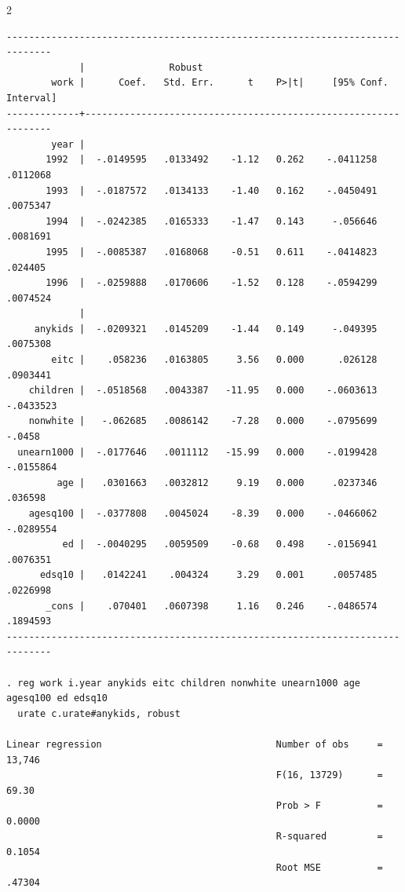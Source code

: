 \documentclass{article}
\newenvironment{changemargin}[2]{%
\begin{list}{}{%
\setlength{\topsep}{0pt}%
\setlength{\leftmargin}{#1}%
\setlength{\rightmargin}{#2}%
\setlength{\listparindent}{\parindent}%
\setlength{\itemindent}{\parindent}%
\setlength{\parsep}{\parskip}%
}%
\item[]}{\end{list}}
\begin{document}
\begin{changemargin}{-0.5in}{-0.5in}
\begin{multicols}{2}
\begin{verbatim}
------------------------------------------------------------------------------
             |               Robust
        work |      Coef.   Std. Err.      t    P>|t|     [95% Conf. Interval]
-------------+----------------------------------------------------------------
        year |
       1992  |  -.0149595   .0133492    -1.12   0.262    -.0411258    .0112068
       1993  |  -.0187572   .0134133    -1.40   0.162    -.0450491    .0075347
       1994  |  -.0242385   .0165333    -1.47   0.143     -.056646    .0081691
       1995  |  -.0085387   .0168068    -0.51   0.611    -.0414823     .024405
       1996  |  -.0259888   .0170606    -1.52   0.128    -.0594299    .0074524
             |
     anykids |  -.0209321   .0145209    -1.44   0.149     -.049395    .0075308
        eitc |    .058236   .0163805     3.56   0.000      .026128    .0903441
    children |  -.0518568   .0043387   -11.95   0.000    -.0603613   -.0433523
    nonwhite |   -.062685   .0086142    -7.28   0.000    -.0795699      -.0458
  unearn1000 |  -.0177646   .0011112   -15.99   0.000    -.0199428   -.0155864
         age |   .0301663   .0032812     9.19   0.000     .0237346     .036598
    agesq100 |  -.0377808   .0045024    -8.39   0.000    -.0466062   -.0289554
          ed |  -.0040295   .0059509    -0.68   0.498    -.0156941    .0076351
      edsq10 |   .0142241    .004324     3.29   0.001     .0057485    .0226998
       _cons |    .070401   .0607398     1.16   0.246    -.0486574    .1894593
------------------------------------------------------------------------------

. reg work i.year anykids eitc children nonwhite unearn1000 age agesq100 ed edsq10 
  urate c.urate#anykids, robust

Linear regression                               Number of obs     =     13,746
                                                F(16, 13729)      =      69.30
                                                Prob > F          =     0.0000
                                                R-squared         =     0.1054
                                                Root MSE          =     .47304


\end{verbatim}
\end{multicols}
\end{changemargin}
\end{document}
